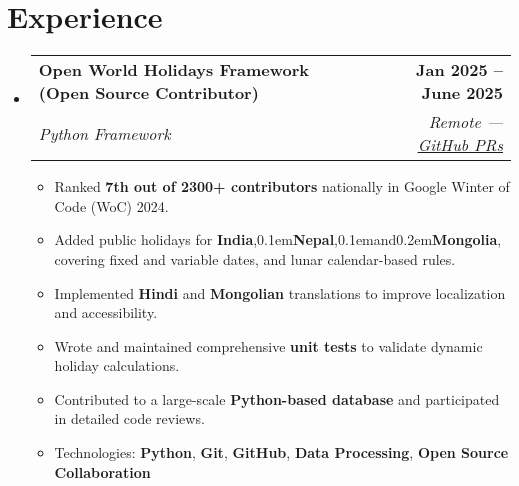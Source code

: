 \documentclass[letterpaper,11pt]{article}
\makeatletter
\newcommand{\resumeItem}[1]{
  \item\small{
    {#1 \vspace{-3pt}}
  }
}
\newcommand{\resumeSubheading}[4]{
  \vspace{-2pt}\item
    \begin{tabular*}{1.0\textwidth}[t]{l@{\extracolsep{\fill}}r}
      \vspace{-2pt}\textbf{#1} & \textbf{\small #2} \\
      \textit{\small#3} & \textit{\small #4} \\
    \end{tabular*}\vspace{-8pt}
} %
\newcommand{\resumeSubHeadingListStart}{\begin{itemize}[leftmargin=0.0in, label={}]}
\newcommand{\resumeSubHeadingListEnd}{\end{itemize}}
\newcommand{\resumeItemListStart}{\begin{itemize}}
\newcommand{\resumeItemListEnd}{\end{itemize}\vspace{-9pt}}
\makeatother
\begin{document}
\section{Experience}
    \resumeSubHeadingListStart
        \resumeSubheading
        {Open World Holidays Framework (Open Source Contributor)}{Jan 2025 -- June 2025}
        {Python Framework}{Remote — \href{https://github.com/vacanza/holidays/pulls/ankushhKapoor}{\underline{GitHub PRs}}}
        \resumeItemListStart
            \resumeItem{Ranked \textbf{7th out of 2300+ contributors} nationally in Google Winter of Code (WoC) 2024.}
            \resumeItem{Added public holidays for \textbf{India},\kern0.1em\textbf{Nepal},\kern0.1emand\kern0.2em\textbf{Mongolia}, covering fixed and variable dates, and lunar calendar-based rules.}
            \resumeItem{Implemented \textbf{Hindi} and \textbf{Mongolian} translations to improve localization and accessibility.}
            \resumeItem{Wrote and maintained comprehensive \textbf{unit tests} to validate dynamic holiday calculations.}
            \resumeItem{Contributed to a large-scale \textbf{Python-based database} and participated in detailed code reviews.}
            \resumeItem{Technologies: \textbf{Python}, \textbf{Git}, \textbf{GitHub}, \textbf{Data Processing}, \textbf{Open Source Collaboration}}
        \resumeItemListEnd
    \resumeSubHeadingListEnd
\vspace{-15pt}



\end{document}

